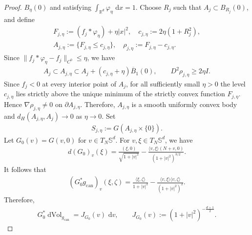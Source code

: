 \documentclass[10pt,a4paper]{amsart}
\def\bR {\mathbb{R}}
\def\bS {\mathbb{S}}
\newcommand{\can}{\mathrm{can}}
\newcommand{\dvol}{\operatorname{dVol}}
\newcommand{\la}{\langle}
\newcommand{\ra}{\rangle}
\newcommand{\ud}{\mathrm{\,d}}
\begin{document}
\begin{proof}
$B_\eta(0)$ and satisfying $ \int_{\bR^d}\varphi_\eta\,\ud x = 1$. Choose $R_j$ such that $A_j\subset B_{R_j}(0)$, and define
\begin{align}
        F_{j,\eta}
        :=(f_j*\varphi_\eta)+\eta|x|^2,
        \quad 
        c_{j,\eta}
        :=2\eta(1+R_j^2),
        \\
        A_{j,\eta}
        :=\{F_{j,\eta}\leq c_{j,\eta}\},
        \quad 
        \rho_{j,\eta}
        :=F_{j,\eta}-c_{j,\eta}.
\end{align}
Since $\|f_j*\varphi_\eta-f_j\|_{C^0}\leq\eta$, we have
\begin{align}\label{eq:hemisphere-pancake-smooth-approximation}
        A_j
        \subset
        A_{j,\eta}
        \subset
        A_j+(c_{j,\eta}+\eta)\overline B_1(0),
        \qquad
        D^2\rho_{j,\eta}
        \geq
        2\eta I.
\end{align}
Since $f_j<0$ at every interior point of $A_j$, for all sufficiently small
$\eta>0$ the level $c_{j,\eta}$ lies strictly above the unique minimum of
the strictly convex function $F_{j,\eta}$. Hence $\nabla\rho_{j,\eta}\neq0$ on $\partial A_{j,\eta}$. Therefore, $A_{j,\eta}$ is a smooth uniformly convex body and
$d_H(A_{j,\eta},A_j)\to0$ as $\eta\to0$. Set
\begin{align}
        S_{j,\eta}
        :=
        G(A_{j,\eta}\times\{0\}).
\end{align}
Let $G_0(v)=G(v,0)$ for $v\in T_N \bS^{d}.$ For $v,\xi\in T_N\bS^d$, we have
\begin{align}
        d(G_0)_v(\xi)
        =
        \frac{(\xi,0)}{\sqrt{1+|v|^2}}
        -
        \frac{\la v,\xi\ra(N+v,0)}
        {(1+|v|^2)^{3/2}}.
\end{align}
It follows that
\begin{align}
        (G_0^*g_{\can})_v(\xi,\zeta)
        =
        \frac{\la\xi,\zeta\ra}{1+|v|^2}
        -
        \frac{\la v,\xi\ra\la v,\zeta\ra}
        {(1+|v|^2)^2}.
\end{align}
Therefore,
\begin{align}\label{eq:hemisphere-pancake-gnomonic-Jacobian}
        G_0^*\dvol_{g_{\can}}
        =
        J_{G_0}(v)\,\ud v,
        \qquad
        J_{G_0}(v)
        :=
        (1+|v|^2)^{-\frac{d+1}{2}}.
\end{align}


\end{proof}
\end{document}
